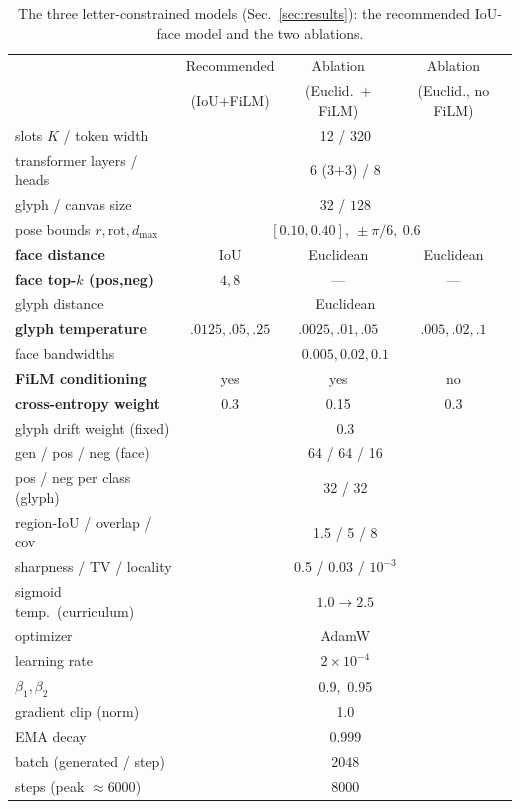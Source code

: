 \documentclass{article}
\begin{document}
\begin{table}[h]
  \caption{The three letter-constrained models (Sec.~\ref{sec:results}): the recommended IoU-face model
  and the two ablations.}
  \label{tab:app_letter}
  \centering\small
  \begin{tabular}{lccc}
    \toprule
     & Recommended & Ablation & Ablation \\
     & (IoU$+$FiLM) & (Euclid.\ $+$FiLM) & (Euclid., no FiLM) \\
    \midrule
    slots $K$ / token width        & \multicolumn{3}{c}{12 / 320} \\
    transformer layers / heads     & \multicolumn{3}{c}{6 (3$+$3) / 8} \\
    glyph / canvas size            & \multicolumn{3}{c}{$32$ / $128$} \\
    pose bounds $r,\mathrm{rot},d_{\max}$ & \multicolumn{3}{c}{$[0.10,0.40],\ \pm\pi/6,\ 0.6$} \\
    \midrule
    \textbf{face distance}         & IoU & Euclidean & Euclidean \\
    \textbf{face top-$k$ (pos,neg)}& $4,8$ & --- & --- \\
    glyph distance                 & \multicolumn{3}{c}{Euclidean} \\
    \textbf{glyph temperature}     & $.0125,.05,.25$ & $.0025,.01,.05$ & $.005,.02,.1$ \\
    face bandwidths                & \multicolumn{3}{c}{$0.005,0.02,0.1$} \\
    \textbf{FiLM conditioning}     & yes & yes & no \\
    \textbf{cross-entropy weight}  & 0.3 & 0.15 & 0.3 \\
    glyph drift weight (fixed)     & \multicolumn{3}{c}{0.3} \\
    gen / pos / neg (face)         & \multicolumn{3}{c}{64 / 64 / 16} \\
    pos / neg per class (glyph)    & \multicolumn{3}{c}{32 / 32} \\
    region-IoU / overlap / cov     & \multicolumn{3}{c}{1.5 / 5 / 8} \\
    sharpness / TV / locality      & \multicolumn{3}{c}{0.5 / 0.03 / $10^{-3}$} \\
    sigmoid temp.\ (curriculum)    & \multicolumn{3}{c}{$1.0\to2.5$} \\
    \midrule
    optimizer                      & \multicolumn{3}{c}{AdamW} \\
    learning rate                  & \multicolumn{3}{c}{$2\times10^{-4}$} \\
    $\beta_1,\beta_2$              & \multicolumn{3}{c}{0.9,\ 0.95} \\
    gradient clip (norm)           & \multicolumn{3}{c}{1.0} \\
    EMA decay                      & \multicolumn{3}{c}{0.999} \\
    batch (generated / step)       & \multicolumn{3}{c}{2048} \\
    steps (peak $\approx 6000$)    & \multicolumn{3}{c}{8000} \\
    \bottomrule
  \end{tabular}
\end{table}
\end{document}
